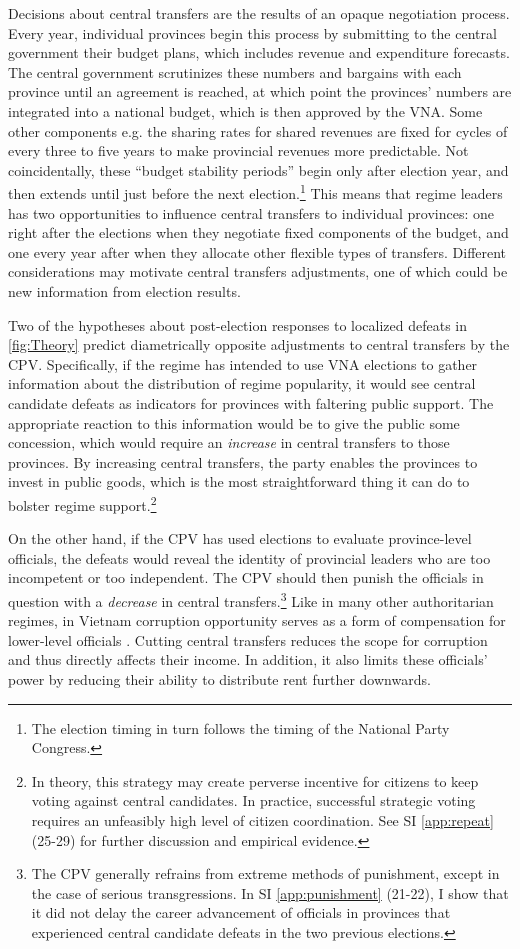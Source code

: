 \documentclass[12pt]{article}
\newcommand\fnote[1]{\footnote{\baselineskip=2\normalbaselineskip#1}}
\newcommand{\1}{\mathbbm{1}}
\begin{document}
Decisions about central transfers are the results of an opaque negotiation process. Every year, individual provinces begin this process by submitting to the central government their budget plans, which includes revenue and expenditure forecasts. The central government scrutinizes these numbers and bargains with each province until an agreement is reached, at which point the provinces' numbers are integrated into a national budget, which is then approved by the VNA. Some other components e.g. the sharing rates for shared revenues are fixed for cycles of every three to five years to make provincial revenues more predictable. Not coincidentally, these ``budget stability periods'' begin only after election year, and then extends until just before the next election.\fnote{The election timing in turn follows the timing of the National Party Congress.} This means that regime leaders has two opportunities to influence central transfers to individual provinces: one right after the elections when they negotiate fixed components of the budget, and one every year after when they allocate other flexible types of transfers. Different considerations may motivate central transfers adjustments, one of which could be new information from election results.

Two of the hypotheses about post-election responses to localized defeats in \autoref{fig:Theory} predict diametrically opposite adjustments to central transfers by the CPV. Specifically, if the regime has intended to use VNA elections to gather information about the distribution of regime popularity, it would see central candidate defeats as indicators for provinces with faltering public support. The appropriate reaction to this information would be to give the public some concession, which would require an \textit{increase} in central transfers to those provinces. By increasing central transfers, the party enables the provinces to invest in public goods, which is the most straightforward thing it can do to bolster regime support.\fnote{In theory, this strategy may create perverse incentive for citizens to keep voting against central candidates. In practice, successful strategic voting requires an unfeasibly high level of citizen coordination. See SI \ref{app:repeat} (25-29) for further discussion and empirical evidence.}

On the other hand, if the CPV has used elections to evaluate province-level officials, the defeats would reveal the identity of provincial leaders who are too incompetent or too independent. The CPV should then punish the officials in question with a \textit{decrease} in central transfers.\fnote{The CPV generally refrains from extreme methods of punishment, except in the case of serious transgressions. In SI \ref{app:punishment} (21-22), I show that it did not delay the career advancement of officials in provinces that experienced central candidate defeats in the two previous elections.} Like in many other authoritarian regimes, in Vietnam corruption opportunity serves as a form of compensation for lower-level officials \citep{Darden2008}. Cutting central transfers reduces the scope for corruption and thus directly affects their income. In addition, it also limits these officials' power by reducing their ability to distribute rent further downwards.
\end{document}
